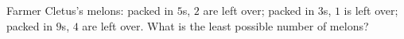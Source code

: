 Farmer Cletus's melons: packed in $5$s, $2$ are left over; packed in $3$s, $1$ is left over; packed in $9$s, $4$ are left over. What is the least possible number of melons?
